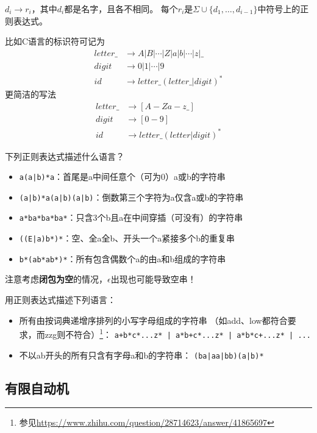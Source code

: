 \begin{definition}[正则定义]
$d_i\to r_i$，其中$d_i$都是名字，且各不相同。
每个$r_i$是$\Sigma\cup\{d_1,\ldots,d_{i-1}\}$中符号上的正则表达式。
\end{definition}
\begin{example}
比如C语言的标识符可记为
\[\begin{aligned}
letter\_ &\to A|B|\cdots|Z|a|b|\cdots|z|\_\\
digit &\to 0|1|\cdots|9\\
id &\to letter\_(letter\_|digit)^*
\end{aligned}\]
更简洁的写法
\[\begin{aligned}
letter\_ &\to [A-Za-z\_]\\
digit &\to [0-9]\\
id &\to letter\_(letter|digit)^*
\end{aligned}\]
\end{example}
\begin{example}
下列正则表达式描述什么语言？
\begin{itemize}
	\item \verb'a(a|b)*a'：首尾是a中间任意个（可为0）a或b的字符串
	\item \verb'(a|b)*a(a|b)(a|b)'：倒数第三个字符为a仅含a或b的字符串
	\item \verb'a*ba*ba*ba*'：只含3个b且a在中间穿插（可没有）的字符串
	\item \verb'((E|a)b*)*'：空、全a全b、开头一个a紧接多个b的重复串
	\item \verb'b*(ab*ab*)*'：所有包含偶数个a的由a和b组成的字符串
\end{itemize}
注意考虑\textbf{闭包为空}的情况，$\epsilon$出现也可能导致空串！
\end{example}
\begin{example}
用正则表达式描述下列语言：
\begin{itemize}
	\item 所有由按词典递增序排列的小写字母组成的字符串
	（如add、low都符合要求，而zzg则不符合）\footnote{参见\url{https://www.zhihu.com/question/28714623/answer/41865697}}：
	\verb'a+b*c*...z* | a*b+c*...z* | a*b*c+...z* | ...'
	\item 不以ab开头的所有只含有字母a和b的字符串：
	\verb'(ba|aa|bb)(a|b)*'
\end{itemize}
\end{example}

\subsection{有限自动机}
